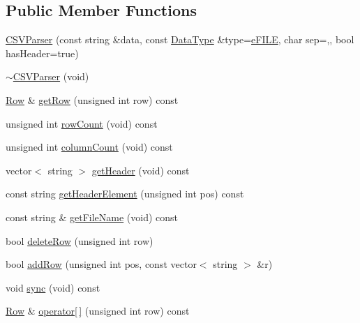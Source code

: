 \subsection*{Public Member Functions}
\begin{DoxyCompactItemize}
\item 
\mbox{\hyperlink{class_c_s_v_parser_aba4d9ee88285f39766e7cc810f46d9d9}{C\+S\+V\+Parser}} (const string \&data, const \mbox{\hyperlink{_c_s_vparser_8hpp_ad8ed01ff3ff33333d8e19db4d2818bb6}{Data\+Type}} \&type=\mbox{\hyperlink{_c_s_vparser_8hpp_ad8ed01ff3ff33333d8e19db4d2818bb6a99e2aefa5a03705fd10b8b72e081349f}{e\+F\+I\+LE}}, char sep=\textquotesingle{},\textquotesingle{}, bool has\+Header=true)
\item 
\mbox{\hyperlink{class_c_s_v_parser_a43f06e2e24a260b80e83821c70f91f56}{$\sim$\+C\+S\+V\+Parser}} (void)
\item 
\mbox{\hyperlink{class_row}{Row}} \& \mbox{\hyperlink{class_c_s_v_parser_a93789f318f0abd972860c507b89d4587}{get\+Row}} (unsigned int row) const
\item 
unsigned int \mbox{\hyperlink{class_c_s_v_parser_ab7596d8458539a585908d41638672f4c}{row\+Count}} (void) const
\item 
unsigned int \mbox{\hyperlink{class_c_s_v_parser_a1e30268d574a0c1911de002a893d7a7e}{column\+Count}} (void) const
\item 
vector$<$ string $>$ \mbox{\hyperlink{class_c_s_v_parser_a95b7d4b188facfec7ebab65413f0130b}{get\+Header}} (void) const
\item 
const string \mbox{\hyperlink{class_c_s_v_parser_ad58dc7b467216ecb75f3bea681af3051}{get\+Header\+Element}} (unsigned int pos) const
\item 
const string \& \mbox{\hyperlink{class_c_s_v_parser_ad9a559d1c8de2a7d88a18170c9e11b80}{get\+File\+Name}} (void) const
\item 
bool \mbox{\hyperlink{class_c_s_v_parser_a1bc14d9edecb802c19ad25bd5cab23b3}{delete\+Row}} (unsigned int row)
\item 
bool \mbox{\hyperlink{class_c_s_v_parser_a7e742c5123efa0a49d576776f8832ddb}{add\+Row}} (unsigned int pos, const vector$<$ string $>$ \&r)
\item 
void \mbox{\hyperlink{class_c_s_v_parser_aa0b2494094eb2ce657787ae830b3cc52}{sync}} (void) const
\item 
\mbox{\hyperlink{class_row}{Row}} \& \mbox{\hyperlink{class_c_s_v_parser_a7d3d0c3f994b825aaba25625f0b01612}{operator\mbox{[}$\,$\mbox{]}}} (unsigned int row) const
\end{DoxyCompactItemize}
